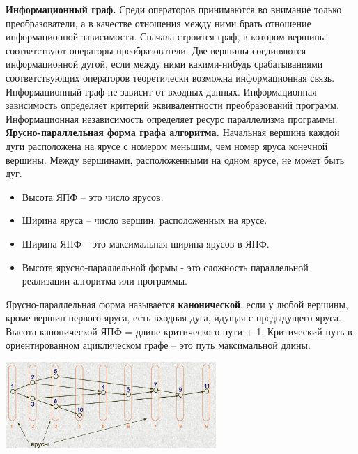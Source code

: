 \textbf{Информационный граф.} Среди операторов принимаются во внимание только преобразователи, а в качестве отношения между ними брать отношение информационной зависимости. Сначала строится граф, в котором вершины соответствуют операторы-преобразователи. Две вершины соединяются информационной дугой, если между ними какими-нибудь срабатываниями соответствующих операторов теоретически возможна информационная связь. Информационный граф не зависит от входных данных. Информационная зависимость определяет критерий эквивалентности преобразований программ.
Информационная независимость определяет ресурс параллелизма программы.\\

\textbf{Ярусно-параллельная форма графа алгоритма.}
Начальная вершина каждой дуги расположена на ярусе с номером меньшим, чем номер яруса конечной вершины. Между вершинами, расположенными на одном ярусе, не может быть дуг.\\
\begin{itemize}
    \item Высота ЯПФ – это число ярусов.
    \item Ширина яруса – число вершин, расположенных на ярусе.
    \item Ширина ЯПФ – это максимальная ширина ярусов в ЯПФ.
    \item Высота ярусно-параллельной формы - это сложность параллельной реализации алгоритма или программы.
\end{itemize}

Ярусно-параллельная форма называется \textbf{канонической}, если у любой вершины, кроме вершин первого яруса, есть входная дуга, идущая с предыдущего яруса.\\
Высота канонической ЯПФ = длине критического пути + 1. Критический путь в ориентированном ациклическом графе – это путь максимальной длины.
\begin{center}
\includegraphics[width=0.6\textwidth]{pics/layered-graph-algo.png}
\end{center}

